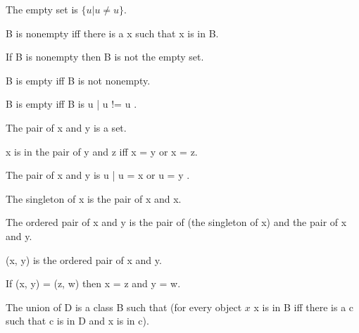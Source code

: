 \documentclass{article}
\begin{document}
\begin{forthel}
    \begin{lemma}
      The empty set is $\{ u | u \neq u \}$.
    \end{lemma}

    \begin{definition}
      B is nonempty iff there is a x such that x is in B.
    \end{definition}

    \begin{lemma}
      If B is nonempty then B is not the empty set.
    \end{lemma}

    \begin{definition}
      B is empty iff B is not nonempty.
    \end{definition}

    \begin{lemma}
      B is empty iff B is { u | u != u }.
    \end{lemma}

    \begin{signature}
      The pair of x and y is a set.
    \end{signature}

    \begin{axiom}[Pair]
      x is in the pair of y and z iff x = y or x = z.
    \end{axiom}

    \begin{lemma}
      The pair of x and y is { u | u = x or u = y }.
    \end{lemma}

    \begin{definition}
      The singleton of x is the pair of x and x.
    \end{definition}

    \begin{definition}
      The ordered pair of x and y is the pair of (the singleton of x) and the pair of x and y.
    \end{definition}

    \begin{definition}
      (x, y) is the ordered pair of x and y.
    \end{definition}

    \begin{lemma}[OrdPair]
      If (x, y) = (z, w) then x = z and y = w.
    \end{lemma}

    \begin{definition}
      The union of D is a class B such that (for every object $x$ x is in B iff there is a c 
        such that c is in D and x is in c).
    \end{definition}


\end{forthel}
\end{document}
